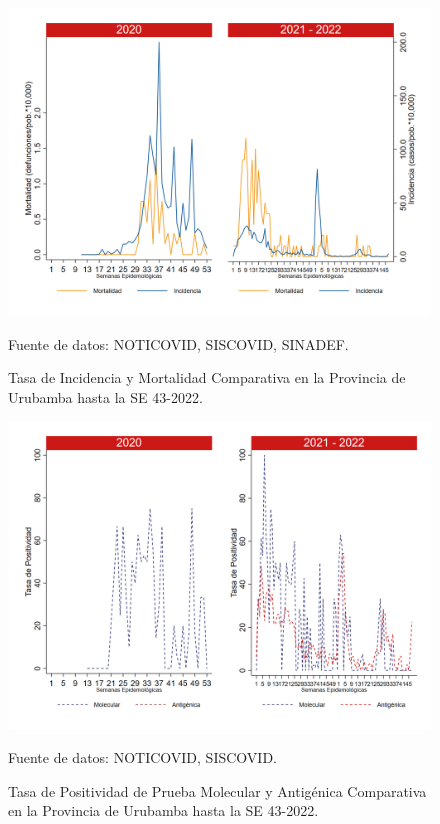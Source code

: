 \documentclass[12pt,a4paper,openany]{book}
\begin{document}
	\begin{figure}[h]
		\caption{Tasa de Incidencia y Mortalidad Comparativa en la Provincia de Urubamba hasta la SE 43-2022.}\label{fig:inc_urub}
		\begin{center}
			\includegraphics[width=0.85\linewidth]{../figuras/incidencia_mortalidad_20_21_13.png}
		\end{center}
		{\footnotesize {Fuente de datos: NOTICOVID, SISCOVID, SINADEF.}}
	\end{figure}
	
	\begin{figure}[h]
		\caption{Tasa de Positividad de Prueba Molecular y Antigénica Comparativa en la Provincia de Urubamba hasta la SE 43-2022.}\label{fig:positividad_urub}
		\begin{center}
			\includegraphics[width=0.7\linewidth]{../figuras/positividad_20_21_13.png}
		\end{center}
		{\footnotesize {Fuente de datos: NOTICOVID, SISCOVID.}}
	\end{figure}
	
\end{document}
